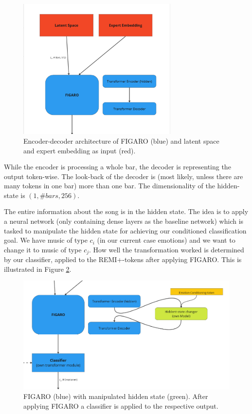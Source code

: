 \documentclass{article}
\begin{document}
\begin{figure}[h]
\centering
\includegraphics[width=8cm]{Figaro}
\caption{Encoder-decoder architecture of FIGARO (blue) and latent space and expert embedding as input (red).}
\label{fig:Figaro}
\end{figure}

While the encoder is processing a whole bar, the decoder is representing the output token-wise. The look-back of the decoder is (most likely, unless there are many tokens in one bar) more than one bar. The dimensionality of the hidden-state is $(1, \#bars, 256)$.

The entire information about the song is in the hidden state. The idea is to apply a neural network (only containing dense layers as the baseline network) which is tasked to manipulate the hidden state for achieving our conditioned classification goal. We have music of type $c_i$ (in our current case emotions) and we want to change it to music of type $c_j$. How well the transformation worked is determined by our classifier, applied to the REMI+-tokens after applying FIGARO. This is illustrated in Figure \ref{fig:Figaro_trans}.

\begin{figure}[h]
\centering
\includegraphics[width=12cm]{Figaro_2}
\caption{FIGARO (blue) with manipulated hidden state (green). After applying FIGARO a classifier is applied to the respective output.}
\label{fig:Figaro_trans}
\end{figure}
\end{document}

